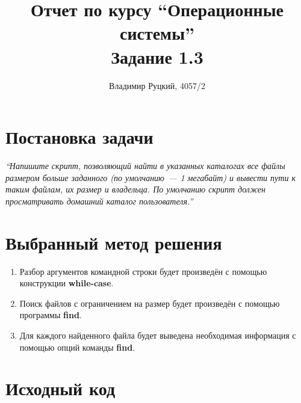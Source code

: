 \documentclass[a4paper,12pt]{article}
\title{Отчет по курсу ``Операционные системы'' \\ Задание 1.3}
\author{Владимир Руцкий, 4057/2}
\newcommand{\commandquote}[1]{\textbf{#1}}
\begin{document}
\maketitle

\section*{Постановка задачи}
\textit{``Напишите скрипт, позволяющий найти в указанных каталогах все файлы
размером больше заданного (по умолчанию~--- 1 мегабайт) и вывести пути к
таким файлам, их размер и владельца. По умолчанию скрипт должен
просматривать домашний каталог пользователя.''}

\section*{Выбранный метод решения}
\begin{enumerate}
 \item Разбор аргументов командной строки будет произведён с помощью конструкции \commandquote{while-case}.
 \item Поиск файлов с ограничением на размер будет произведён с помощью программы \commandquote{find}.
 \item Для каждого найденного файла будет выведена необходимая информация с помощью опций команды \commandquote{find}.
\end{enumerate}

\section*{Исходный код}
\lstset{language=bash, caption=task\_1\_3.sh,%
label=source-code, basicstyle=\footnotesize,%
numbers=left, numberstyle=\footnotesize, numbersep=5pt, frame=single, breaklines=true, breakatwhitespace=false,%
inputencoding=utf8x}

\end{document}
